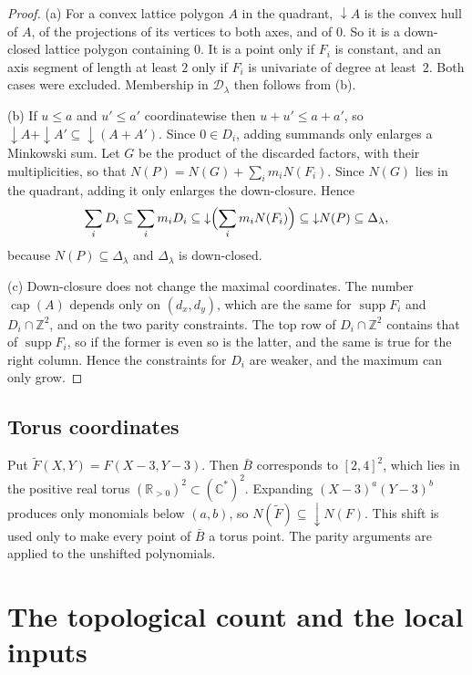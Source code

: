 \documentclass[11pt]{amsart}
\theoremstyle{definition}
\theoremstyle{remark}
\newcommand{\R}{\mathbb{R}}
\newcommand{\C}{\mathbb{C}}
\newcommand{\Z}{\mathbb{Z}}
\newcommand{\capn}{\operatorname{cap}}
\newcommand{\supp}{\operatorname{supp}}
\newcommand{\down}{{\downarrow}}
\numberwithin{equation}{section}
\begin{document}
\begin{proof}
(a) For a convex lattice polygon $A$ in the quadrant, $\down A$ is the convex hull of $A$,
of the projections of its vertices to both axes, and of $0$. So it is a down-closed lattice
polygon containing $0$. It is a point only if $F_i$ is constant, and an axis segment of
length at least $2$ only if $F_i$ is univariate of degree at least~$2$. Both cases were excluded.
Membership in $\mathcal D_\lambda$ then follows from (b).

(b) If $u\le a$ and $u'\le a'$ coordinatewise then $u+u'\le a+a'$, so
$\down A+\down A'\subseteq\down(A+A')$. Since $0\in D_i$, adding summands only enlarges a
Minkowski sum. Let $G$ be the product of the discarded factors, with their multiplicities, so
that $N(P)=N(G)+\sum_im_iN(F_i)$. Since $N(G)$ lies in the quadrant, adding it only enlarges
the down-closure. Hence
\[
\sum_iD_i\subseteq\sum_im_iD_i\subseteq\down\Bigl(\sum_im_iN(F_i)\Bigr)\subseteq\down N(P)
\subseteq\Delta_\lambda,
\]
because $N(P)\subseteq\Delta_\lambda$ and $\Delta_\lambda$ is down-closed.

(c) Down-closure does not change the maximal coordinates. The number $\capn(A)$ depends only on
$(d_x,d_y)$, which are the same for $\supp F_i$ and $D_i\cap\Z^2$, and on the two parity
constraints. The top row of $D_i\cap\Z^2$ contains that of $\supp F_i$, so if the former is
even so is the latter, and the same is true for the right column. Hence the constraints for $D_i$ are
weaker, and the maximum can only grow.
\end{proof}

\subsection{Torus coordinates}
Put $\tilde F(X,Y)=F(X-3,Y-3)$. Then $\bar B$ corresponds to $[2,4]^2$, which lies in the
positive real torus $(\R_{>0})^2\subset(\C^*)^2$. Expanding $(X-3)^a(Y-3)^b$ produces only
monomials below $(a,b)$, so $N(\tilde F)\subseteq\down N(F)$. This shift is used only to make
every point of $\bar B$ a torus point. The parity arguments are applied to the unshifted
polynomials.

\section{The topological count and the local inputs}\label{sec:inputs}
\end{document}
